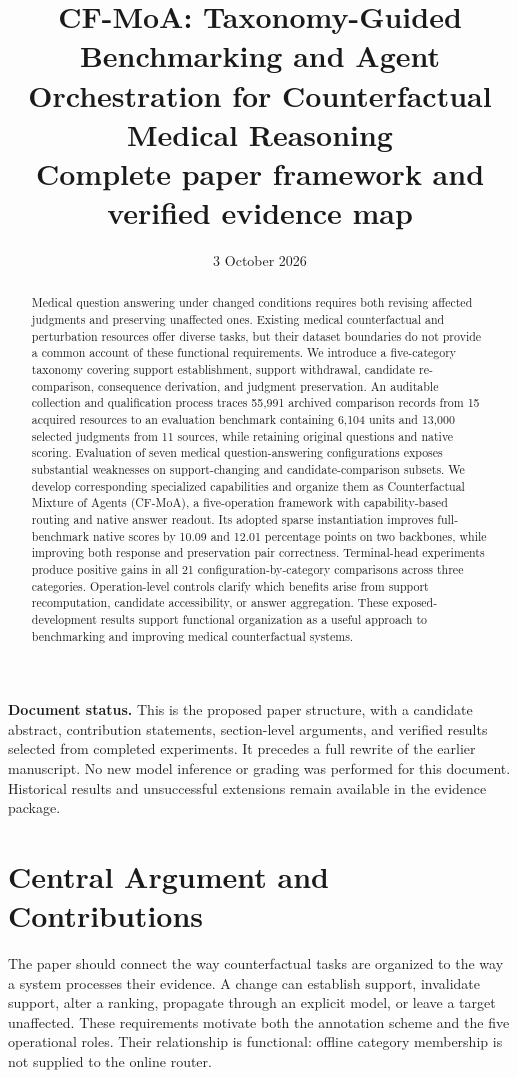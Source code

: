 \documentclass[11pt,a4paper]{article}
\title{CF-MoA: Taxonomy-Guided Benchmarking and Agent Orchestration for Counterfactual Medical Reasoning\\[0.6em]\large Complete paper framework and verified evidence map}
\author{}
\date{3 October 2026}
\begin{document}
\maketitle
\noindent\textbf{Document status.} This is the proposed paper structure, with a candidate abstract, contribution statements, section-level arguments, and verified results selected from completed experiments. It precedes a full rewrite of the earlier manuscript. No new model inference or grading was performed for this document. Historical results and unsuccessful extensions remain available in the evidence package.

\begin{abstract}
Medical question answering under changed conditions requires both revising affected judgments and preserving unaffected ones. Existing medical counterfactual and perturbation resources offer diverse tasks, but their dataset boundaries do not provide a common account of these functional requirements. We introduce a five-category taxonomy covering support establishment, support withdrawal, candidate re-comparison, consequence derivation, and judgment preservation. An auditable collection and qualification process traces 55,991 archived comparison records from 15 acquired resources to an evaluation benchmark containing 6,104 units and 13,000 selected judgments from 11 sources, while retaining original questions and native scoring. Evaluation of seven medical question-answering configurations exposes substantial weaknesses on support-changing and candidate-comparison subsets. We develop corresponding specialized capabilities and organize them as Counterfactual Mixture of Agents (CF-MoA), a five-operation framework with capability-based routing and native answer readout. Its adopted sparse instantiation improves full-benchmark native scores by 10.09 and 12.01 percentage points on two backbones, while improving both response and preservation pair correctness. Terminal-head experiments produce positive gains in all 21 configuration-by-category comparisons across three categories. Operation-level controls clarify which benefits arise from support recomputation, candidate accessibility, or answer aggregation. These exposed-development results support functional organization as a useful approach to benchmarking and improving medical counterfactual systems.
\end{abstract}

\section{Central Argument and Contributions}
The paper should connect the way counterfactual tasks are organized to the way a system processes their evidence. A change can establish support, invalidate support, alter a ranking, propagate through an explicit model, or leave a target unaffected. These requirements motivate both the annotation scheme and the five operational roles. Their relationship is functional: offline category membership is not supplied to the online router.
\end{document}
